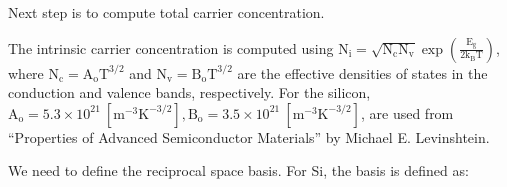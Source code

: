 \documentclass[letterpaper,10pt,english]{sphinxmanual}
\begin{document}
\sphinxAtStartPar
Next step is to compute total carrier concentration.

\begin{sphinxVerbatim}[commandchars=\\\{\}]
   
                                                  
\end{sphinxVerbatim}

\sphinxAtStartPar
The intrinsic carrier concentration is computed using \(\mathrm{N_i = \sqrt{N_c N_v} \exp(\frac{E_g}{2k_B T})}\),
where \(\mathrm{N_c = A_o T^{3/2}}\) and \(\mathrm{N_v = B_o T^{3/2}}\) are the effective densities of states
in the conduction and valence bands, respectively. For the silicon,
\(\mathrm{A_o = 5.3 \times 10^{21}\ [m^{-3}K^{-3/2}], B_o = 3.5 \times 10^{21}\ [m^{-3}K^{-3/2}]}\), are used from
“Properties of Advanced Semiconductor Materials” by Michael E. Levinshtein.

\sphinxAtStartPar
We need to define the reciprocal space basis. For Si, the basis is defined as:
\end{document}
